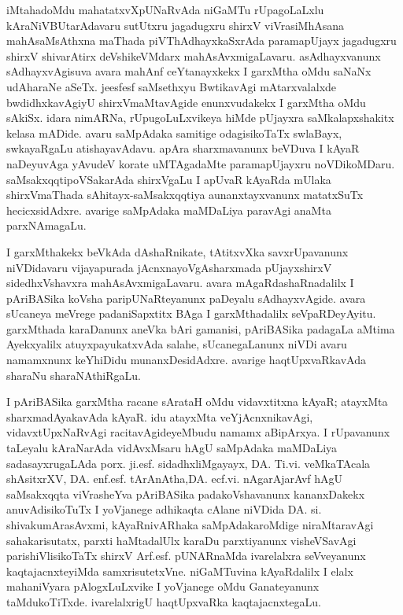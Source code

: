 iMtahadoMdu mahatatxvXpUNaRvAda niGaMTu rUpagoLaLxlu kAraNiVBUtarAdavaru sutUtxru jagadugxru shirxV viVrasiMhAsana mahAsaMsAthxna maThada piVThAdhayxkaSxrAda paramapUjayx jagadugxru shirxV shivarAtirx deVshikeVMdarx mahAsAvxmigaLavaru. asAdhayxvanunx sAdhayx\-vAgisuva avara mahAnf ceYtanayxkekx I garxMtha oMdu saNaNx udAharaNe aSeTx. jeesfesf saMsethxyu BwtikavAgi mAtarxvalalxde bwdidhxka\-vAgiyU shirxVmaMtavAgide enunxvudakekx I garxMtha oMdu sAkiSx. idara nimARNa, rUpugoLuLxvikeya hiMde pUjayxra saMkalapxshakitx kelasa mADide. avaru saMpAdaka samitige odagisikoTaTx swlaBayx, swkayaRgaLu atishayavAdavu. apAra sharxmavanunx beVDuva I kAyaR naDeyuvAga yAvudeV korate uMTAgadaMte paramapUjayxru noVDikoMDaru. saMsakxqqtipoVSakarAda shirxVgaLu I apUvaR kAyaRda mUlaka shirxVmaThada sAhitayx-saMsakxqqtiya aunanxtayxvanunx matatxSuTx hecicxsidAdxre. avarige saMpAdaka maMDaLiya paravAgi anaMta parxNAmagaLu.

\smallskip

I garxMthakekx beVkAda dAshaRnikate, tAtitxvXka savxrUpavanunx niVDidavaru vijayapurada jAcnxnayoVgAsharxmada pUjayx\break shirxV sidedhxVshavxra mahAsAvxmigaLavaru. avara mAgaRdashaRnadalilx I pAriBASika koVsha paripUNaRteyanunx paDeyalu sAdhayxvAgide. avara sUcaneya meVrege padaniSapxtitx BAga I garxMthadalilx seVpaRDeyAyitu.  garxMthada karaDanunx aneVka bAri gamanisi, pAriBASika padagaLa aMtima Ayekxyalilx atuyxpa\-yukatxvAda salahe, sUcanegaLanunx niVDi avaru namamxnunx keYhiDidu munanxDesidAdxre. avarige haqtUpxvaRkavAda sharaNu sharaNAthiRgaLu.

\smallskip

I pAriBASika garxMtha racane sArataH oMdu vidavxtitxna kAyaR; atayxMta sharxmadAyakavAda kAyaR. idu atayxMta veYjAcnxnika\-vAgi, vidavxtUpxNaRvAgi racitavAgideyeMbudu namamx aBipArxya. I rUpavanunx taLeyalu kAraNarAda vidAvxMsaru hAgU saMpAdaka maMDaLiya sadasayxrugaLAda porx. ji.esf. sidadhxliMgayayx, DA. Ti.vi. veMkaTAcala shAsitxrXV, DA. enf.esf. tArAnAtha,\break DA. ecf.vi. nAgarAjarAvf hAgU saMsakxqqta \hbox{viVrasheYva} pAri\-BASika padakoVshavanunx kananxDakekx anuvAdisikoTuTx I yoVjanege adhi\-kaqta cAlane niVDida DA. si. shivakumArasAvxmi, kAyaRnivARhaka saMpAdakaroMdige niraMtaravAgi sahakarisutatx, parxti haMtadalUlx karaDu parxtiyanunx visheVSavAgi parishiVlisikoTaTx shirxV Arf.esf. pUNARnaMda ivarelalxra seVveyanunx kaqtajacnxteyiMda samxrisutetxVne. niGaMTuvina kAyaRdalilx I elalx mahaniVyara pAlogxLuLxvike I yoVjanege oMdu Ganateyanunx taMdu\-koTiTxde. ivarelalxrigU haqtUpxvaRka kaqtajacnxtegaLu.

